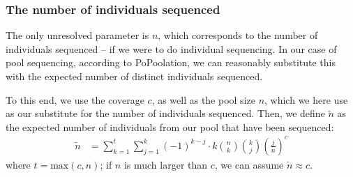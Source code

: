 \documentclass[a4paper,fontsize=9pt,DIV=14]{scrartcl}
\newcounter{todo}
\newcounter{popoolissue}
\newcommand\todo[1]{{\stepcounter{todo}\color{purple}{TODO \arabic{todo}: #1}}}
\newcommand\popoolissue[1]{}
\newcommand{\coverage}{c}
\begin{document}
\popoolissue{Furthermore, we tested the computation of alpha*, and it also gives NaN values for input 2 and 3, so the test should in fact be $>= 4$ instead.}


\subsubsection*{The number of individuals sequenced}

The only unresolved parameter is $n$, which corresponds to the number of individuals sequenced --
if we were to do individual sequencing.
In our case of pool sequencing, according to PoPoolation,
we can reasonably substitute this with the expected number of distinct individuals sequenced.

To this end, we use the coverage $\coverage$, as well as the pool size $n$, which we here use as our substitute for the number of individuals sequenced.
Then, we define $\tilde{n}$ as the expected number of individuals from our pool that have been sequenced:
%
\begin{align}
    \label{eq:IndivSeqBruteForce}
    \tilde{n}
    &= \sum_{k=1}^{t} \sum_{j=1}^{k} (-1)^{k-j} \cdot k \binom{n}{k} \binom{k}{j} \left(\frac{j}{n}\right)^\coverage
\end{align}
%
where $t=\text{max}(\coverage, n)$; if $n$ is much larger than $\coverage$, we can assume $\tilde{n} \approx \coverage$.

\popoolissue{We think that there is either an error here, or a bug in the code. The code in PoPoolation actually uses the minimum of coverage and pool size in the above, instead of the maximum as stated above, see \href{https://github.com/lczech/popoolation/blob/092e7a6f7ee4910c1bec4377e0adccc353175bc8/Modules/VarMath.pm\#L156}{here}. We are not sure which one is correct though, or what the implications of this are.}
\end{document}

